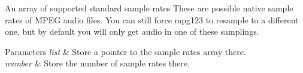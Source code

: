 An array of supported standard sample rates These are possible native sample rates of M\+P\+EG audio files. You can still force mpg123 to resample to a different one, but by default you will only get audio in one of these samplings. 
\begin{DoxyParams}{Parameters}
{\em list} & Store a pointer to the sample rates array there. \\
\hline
{\em number} & Store the number of sample rates there. \\
\hline
\end{DoxyParams}
